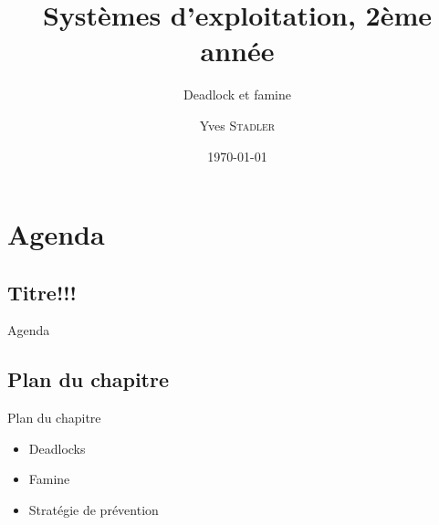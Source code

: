 \title{Systèmes d'exploitation, 2ème année}
\subtitle{Deadlock et famine}

\author{Yves \textsc{Stadler}}

\date{\today}




\begin{frame}
\titlepage
\end{frame}


\def\sectitle{Agenda}
\section{\sectitle}

\def\subsectitle{Titre!!!}
\subsection{\subsectitle}

\begin{frame}{\sectitle}
\def\subsectitle{Plan du chapitre}
\subsection{\subsectitle}
\begin{block}{\subsectitle}
\begin{itemize}
\item Deadlocks
\item Famine
\item Stratégie de prévention
\end{itemize}
\end{block}
\end{frame}

\def\sectitle{Découverte du deadlock}
